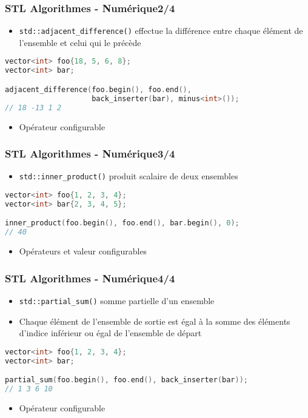 \documentclass[C++.tex]{subfiles}
\begin{document}
\begin{frame}[fragile]
	\frametitle{STL Algorithmes - Numérique\titlehfill{}2/4}
	\begin{itemize}
		\item \lstinline|std::adjacent_difference()| effectue la \og différence\fg{} entre chaque élément de l'ensemble et celui qui le précède
	\end{itemize}

	\begin{lstlisting}[language=C++]
vector<int> foo{18, 5, 6, 8};
vector<int> bar;

adjacent_difference(foo.begin(), foo.end(), 
                    back_inserter(bar), minus<int>());
// 18 -13 1 2\end{lstlisting}

	\begin{itemize}
		\item Opérateur configurable
	\end{itemize}
\end{frame}

\begin{frame}[fragile]
	\frametitle{STL Algorithmes - Numérique\titlehfill{}3/4}
	\begin{itemize}
		\item \lstinline|std::inner_product()| \og produit scalaire\fg{} de deux ensembles
	\end{itemize}

	\begin{lstlisting}[language=C++]
vector<int> foo{1, 2, 3, 4};
vector<int> bar{2, 3, 4, 5};

inner_product(foo.begin(), foo.end(), bar.begin(), 0);
// 40\end{lstlisting}

	\begin{itemize}
		\item Opérateurs et valeur configurables
	\end{itemize}
\end{frame}

\begin{frame}[fragile]
	\frametitle{STL Algorithmes - Numérique\titlehfill{}4/4}
	\begin{itemize}
		\item \lstinline|std::partial_sum()| \og somme\fg{} partielle d'un ensemble
		\item Chaque élément de l'ensemble de sortie est égal à la somme des éléments d'indice inférieur ou égal de l'ensemble de départ
	\end{itemize}

	\begin{lstlisting}[language=C++]
vector<int> foo{1, 2, 3, 4};
vector<int> bar;

partial_sum(foo.begin(), foo.end(), back_inserter(bar));
// 1 3 6 10\end{lstlisting}

	\begin{itemize}
		\item Opérateur configurable
	\end{itemize}
\end{frame}
\end{document}
